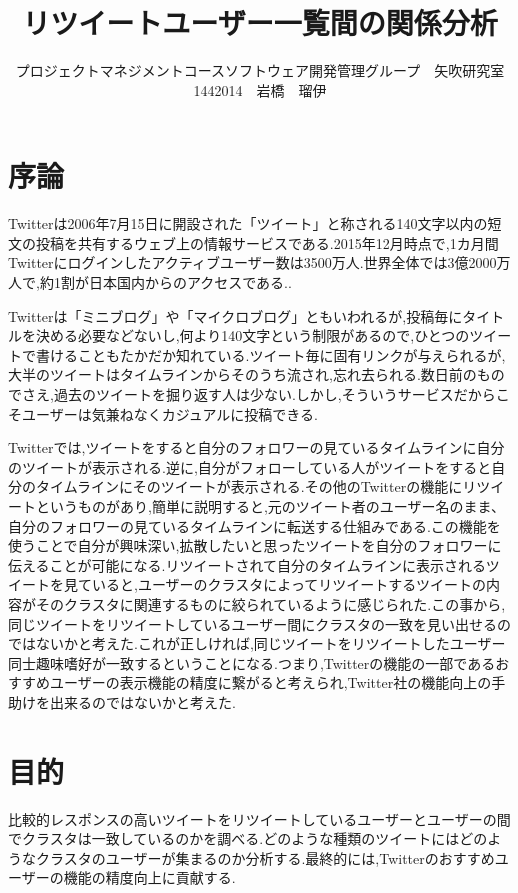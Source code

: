 \documentclass[uplatex,twocolumn,dvipdfmx]{jsarticle}
\title{\vspace{-5mm}\fontsize{14pt}{0pt}\selectfont リツイートユーザー一覧間の関係分析}
\author{\normalsize プロジェクトマネジメントコースソフトウェア開発管理グループ　矢吹研究室　1442014　岩橋　瑠伊}
\date{}
\begin{document}
\fontsize{10.5pt}{\baselineskip}\selectfont
\maketitle





\section{序論}
Twitterは2006年7月15日に開設された「ツイート」と称される140文字以内の短文の投稿を共有するウェブ上の情報サービスである.2015年12月時点で,1カ月間Twitterにログインしたアクティブユーザー数は3500万人.世界全体では3億2000万人で,約1割が日本国内からのアクセスである.\cite{twitter}.

Twitterは「ミニブログ」や「マイクロブログ」ともいわれるが,投稿毎にタイトルを決める必要などないし,何より140文字という制限があるので,ひとつのツイートで書けることもたかだか知れている.ツイート毎に固有リンクが与えられるが,大半のツイートはタイムラインからそのうち流され,忘れ去られる.数日前のものでさえ,過去のツイートを掘り返す人は少ない.しかし,そういうサービスだからこそユーザーは気兼ねなくカジュアルに投稿できる\cite{kondou2015}.

Twitterでは,ツイートをすると自分のフォロワーの見ているタイムラインに自分のツイートが表示される.逆に,自分がフォローしている人がツイートをすると自分のタイムラインにそのツイートが表示される.その他のTwitterの機能にリツイートというものがあり,簡単に説明すると,元のツイート者のユーザー名のまま、自分のフォロワーの見ているタイムラインに転送する仕組みである.この機能を使うことで自分が興味深い,拡散したいと思ったツイートを自分のフォロワーに伝えることが可能になる.リツイートされて自分のタイムラインに表示されるツイートを見ていると,ユーザーのクラスタによってリツイートするツイートの内容がそのクラスタに関連するものに絞られているように感じられた.この事から,同じツイートをリツイートしているユーザー間にクラスタの一致を見い出せるのではないかと考えた.これが正しければ,同じツイートをリツイートしたユーザー同士趣味嗜好が一致するということになる.つまり,Twitterの機能の一部であるおすすめユーザーの表示機能の精度に繋がると考えられ,Twitter社の機能向上の手助けを出来るのではないかと考えた.


\section{目的}
比較的レスポンスの高いツイートをリツイートしているユーザーとユーザーの間でクラスタは一致しているのかを調べる.どのような種類のツイートにはどのようなクラスタのユーザーが集まるのか分析する.最終的には,Twitterのおすすめユーザーの機能の精度向上に貢献する.
\end{document}
